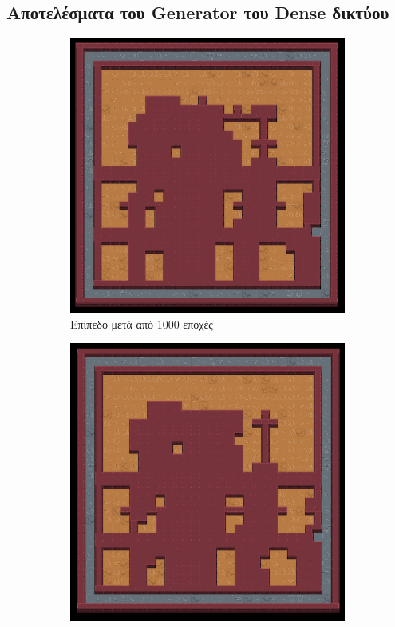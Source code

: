 \subsection{Αποτελέσματα του Generator του Dense δικτύου}
\begin{figure}[H]
\begin{subfigure}{.5\textwidth}
  \centering
  \includegraphics[width=.8\linewidth]{../images/result_images/dense-gan/generator_1000.png}
  \caption{Επίπεδο μετά από 1000 εποχές}
  \label{fig:sfig1}
\end{subfigure}%
\begin{subfigure}{.5\textwidth}
  \centering
  \includegraphics[width=.8\linewidth]{../images/result_images/dense-gan/generator_3000.png}

\end{subfigure}
\end{figure}
